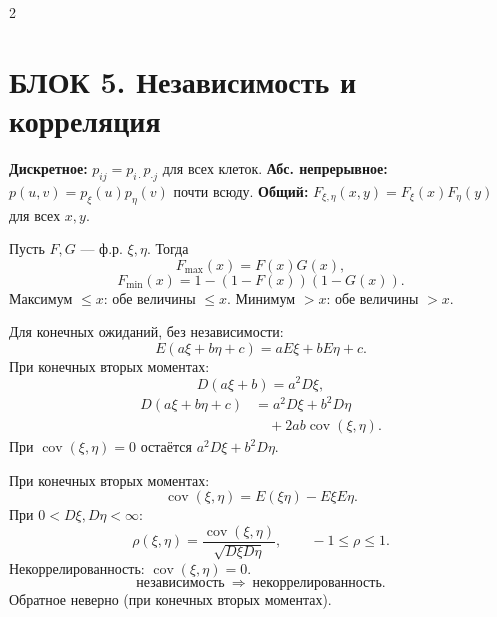 \documentclass[a4paper,10pt]{article}
\newcommand{\blk}[2]{\section{БЛОК #1. #2}}
\begin{document}
\begin{multicols}{2}
\blk{5}{Независимость и корреляция}
\begin{theorem}
\textbf{Дискретное:} $p_{ij}=p_{i\cdot}p_{\cdot j}$ для всех клеток.
\textbf{Абс. непрерывное:} $p(u,v)=p_\xi(u)p_\eta(v)$ почти всюду.
\textbf{Общий:} $F_{\xi,\eta}(x,y)=F_\xi(x)F_\eta(y)$ для всех $x,y$.

\end{theorem}
\begin{theorem}
Пусть $F,G$ --- ф.р. $\xi,\eta$. Тогда
\[
F_{\max}(x)=F(x)G(x),
\]
\[
F_{\min}(x)=1-(1-F(x))(1-G(x)).
\]
Максимум $\le x$: обе величины $\le x$.
Минимум $>x$: обе величины $>x$.

\end{theorem}
\begin{theorem}
Для конечных ожиданий, без независимости:
\[
E(a\xi+b\eta+c)=aE\xi+bE\eta+c.
\]
При конечных вторых моментах:
\[
D(a\xi+b)=a^2D\xi,
\]
\[
\begin{aligned}
D(a\xi+b\eta+c)&=a^2D\xi+b^2D\eta\\
&\quad+2ab\operatorname{cov}(\xi,\eta).
\end{aligned}
\]
При $\operatorname{cov}(\xi,\eta)=0$ остаётся $a^2D\xi+b^2D\eta$.
\end{theorem}
\begin{definition}
При конечных вторых моментах:
\[
\operatorname{cov}(\xi,\eta)=E(\xi\eta)-E\xi E\eta.
\]
При $0<D\xi,D\eta<\infty$:
\[
\rho(\xi,\eta)=\frac{\operatorname{cov}(\xi,\eta)}{\sqrt{D\xi D\eta}},
\qquad -1\le\rho\le1.
\]
Некоррелированность: $\operatorname{cov}(\xi,\eta)=0$.
\[
\text{независимость}\ \Longrightarrow\ \text{некоррелированность}.
\]
Обратное неверно (при конечных вторых моментах).
\end{definition}
\end{multicols}
\end{document}

